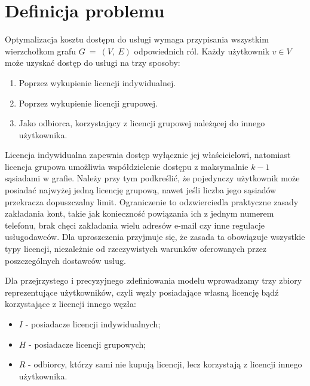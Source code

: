 \section{Definicja problemu}\label{sec:model-formal}

Optymalizacja kosztu dostępu do usługi wymaga przypisania wszystkim wierzchołkom grafu $G ~=~ (V,~E)$ odpowiednich ról. Każdy użytkownik $v \in V$ może uzyskać dostęp do usługi na trzy sposoby:
\begin{enumerate}
  \item Poprzez wykupienie licencji indywidualnej.
  \item Poprzez wykupienie licencji grupowej.
  \item Jako odbiorca, korzystający z licencji grupowej należącej do innego użytkownika.
\end{enumerate}
Licencja indywidualna zapewnia dostęp wyłącznie jej właścicielowi, natomiast licencja grupowa umożliwia współdzielenie dostępu z maksymalnie $k-1$ sąsiadami w grafie. Należy przy tym podkreślić, że pojedynczy użytkownik może posiadać najwyżej jedną licencję grupową, nawet jeśli liczba jego sąsiadów przekracza dopuszczalny limit. 
Ograniczenie to odzwierciedla praktyczne zasady zakładania kont, takie jak konieczność powiązania ich z jednym numerem telefonu, brak chęci zakładania wielu adresów e-mail czy inne regulacje usługodawców. 
Dla uproszczenia przyjmuje się, że zasada ta obowiązuje wszystkie typy licencji, niezależnie od rzeczywistych warunków oferowanych przez poszczególnych dostawców usług.

Dla przejrzystego i precyzyjnego zdefiniowania modelu wprowadzamy trzy zbiory reprezentujące użytkowników, czyli węzły posiadające własną licencję bądź korzystające z licencji innego węzła:
\begin{itemize}
  \item $I$ - posiadacze licencji indywidualnych;
  \item $H$ - posiadacze licencji grupowych;
  \item $R$ - odbiorcy, którzy sami nie kupują licencji, lecz korzystają z licencji innego użytkownika.
\end{itemize}

